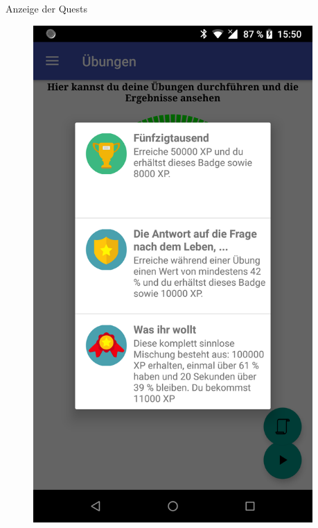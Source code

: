 \documentclass[final,20pt]{beamer}
\newlength{\sepwidth}
\newlength{\colwidth}
\newcommand{\separatorcolumn}{\begin{column}{\sepwidth}\end{column}}
\begin{document}
\begin{frame}[t]
\begin{columns}[t]
\begin{column}{\colwidth}
	\begin{alertblock}{Anzeige der Quests}
		\begin{figure}[H]
			\centering
			\includegraphics[width=0.6\colwidth]{pics/device-badges}
		\end{figure}
	\end{alertblock}

\end{column}

\separatorcolumn
\end{columns}
\end{frame}
\end{document}
